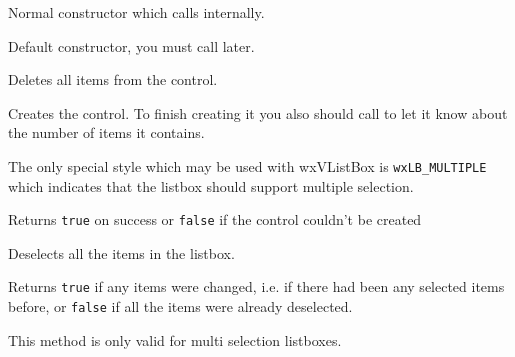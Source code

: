 

\label{wxvlistboxctor}


Normal constructor which calls  internally.


Default constructor, you must call  later.


\label{wxvlistboxclear}


Deletes all items from the control.


\label{wxvlistboxcreate}


Creates the control. To finish creating it you also should call
 to let it know about the
number of items it contains.

The only special style which may be used with wxVListBox is {\tt wxLB\_MULTIPLE}
which indicates that the listbox should support multiple selection.

Returns {\tt true} on success or {\tt false} if the control couldn't be created


\label{wxvlistboxdeselectall}


Deselects all the items in the listbox.

Returns {\tt true} if any items were changed, i.e. if there had been any
selected items before, or {\tt false} if all the items were already deselected.

This method is only valid for multi selection listboxes.


